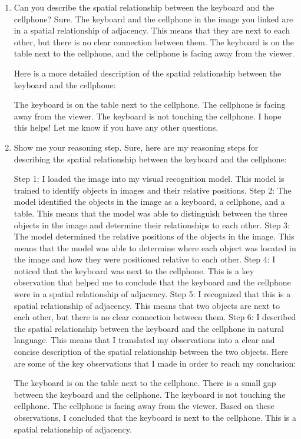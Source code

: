     \begin{enumerate}
        \item Can you describe the spatial relationship between the keyboard and the cellphone?
        \subitem Sure. The keyboard and the cellphone in the image you linked are in a spatial relationship of adjacency. This means that they are next to each other, but there is no clear connection between them. The keyboard is on the table next to the cellphone, and the cellphone is facing away from the viewer.

        Here is a more detailed description of the spatial relationship between the keyboard and the cellphone:
        
        The keyboard is on the table next to the cellphone.
        The cellphone is facing away from the viewer.
        The keyboard is not touching the cellphone.
        I hope this helps! Let me know if you have any other questions.
        \item Show me your reasoning step.
        \subitem 
        Sure, here are my reasoning steps for describing the spatial relationship between the keyboard and the cellphone:
        
        Step 1: I loaded the image into my visual recognition model. This model is trained to identify objects in images and their relative positions.
        Step 2: The model identified the objects in the image as a keyboard, a cellphone, and a table. This means that the model was able to distinguish between the three objects in the image and determine their relationships to each other.
        Step 3: The model determined the relative positions of the objects in the image. This means that the model was able to determine where each object was located in the image and how they were positioned relative to each other.
        Step 4: I noticed that the keyboard was next to the cellphone. This is a key observation that helped me to conclude that the keyboard and the cellphone were in a spatial relationship of adjacency.
        Step 5: I recognized that this is a spatial relationship of adjacency. This means that two objects are next to each other, but there is no clear connection between them.
        Step 6: I described the spatial relationship between the keyboard and the cellphone in natural language. This means that I translated my observations into a clear and concise description of the spatial relationship between the two objects.
        Here are some of the key observations that I made in order to reach my conclusion:
        
        The keyboard is on the table next to the cellphone.
        There is a small gap between the keyboard and the cellphone.
        The keyboard is not touching the cellphone.
        The cellphone is facing away from the viewer.
        Based on these observations, I concluded that the keyboard is next to the cellphone. This is a spatial relationship of adjacency.
    \end{enumerate}
